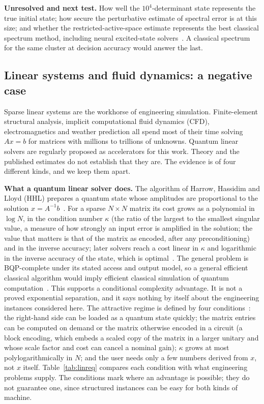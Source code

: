 \documentclass[10pt,a4paper]{article}
\begin{document}
\textbf{Unresolved and next test.} How well the $10^4$-determinant state represents the true initial state; how secure the perturbative estimate of spectral error is at this size; and whether the restricted-active-space estimate represents the best classical spectrum method, including neural excited-state solvers~\cite{pfau2024}. A classical spectrum for the same cluster at decision accuracy would answer the last.

\subsection{Linear systems and fluid dynamics: a negative case}
\label{sec:linear}
Sparse linear systems are the workhorse of engineering simulation. Finite-element structural analysis, implicit computational fluid dynamics (CFD), electromagnetics and weather prediction all spend most of their time solving $Ax=b$ for matrices with millions to trillions of unknowns. Quantum linear solvers are regularly proposed as accelerators for this work. Theory and the published estimates do not establish that they are. The evidence is of four different kinds, and we keep them apart.

\textbf{What a quantum linear solver does.} The algorithm of Harrow, Hassidim and Lloyd (HHL) prepares a quantum state whose amplitudes are proportional to the solution $x=A^{-1}b$~\cite{hhl2009}. For a sparse $N\times N$ matrix its cost grows as a polynomial in $\log N$, in the condition number $\kappa$ (the ratio of the largest to the smallest singular value, a measure of how strongly an input error is amplified in the solution; the value that matters is that of the matrix as encoded, after any preconditioning) and in the inverse accuracy; later solvers reach a cost linear in $\kappa$ and logarithmic in the inverse accuracy of the state, which is optimal~\cite{costa2022}. The general problem is BQP-complete under its stated access and output model, so a general efficient classical algorithm would imply efficient classical simulation of quantum computation~\cite{hhl2009}. This supports a conditional complexity advantage. It is not a proved exponential separation, and it says nothing by itself about the engineering instances considered here. The attractive regime is defined by four conditions~\cite{aaronson2015}: the right-hand side can be loaded as a quantum state quickly; the matrix entries can be computed on demand or the matrix otherwise encoded in a circuit (a block encoding, which embeds a scaled copy of the matrix in a larger unitary and whose scale factor and cost can cancel a nominal gain); $\kappa$ grows at most polylogarithmically in $N$; and the user needs only a few numbers derived from $x$, not $x$ itself. Table~\ref{tab:linreq} compares each condition with what engineering problems supply. The conditions mark where an advantage is possible; they do not guarantee one, since structured instances can be easy for both kinds of machine.
\end{document}

